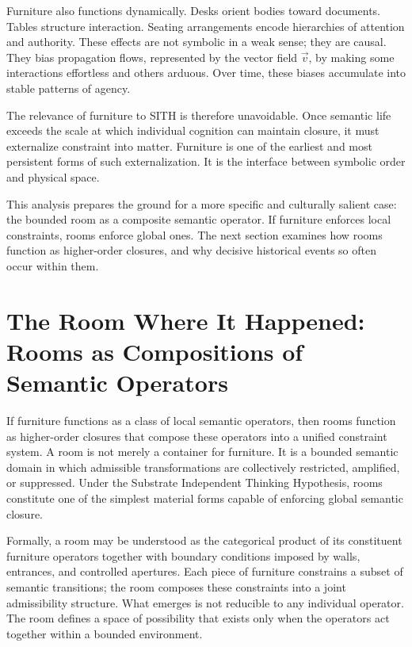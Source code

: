 \documentclass[11pt,oneside]{article}
\begin{document}
Furniture also functions dynamically. Desks orient bodies toward documents. Tables structure interaction. Seating arrangements encode hierarchies of attention and authority. These effects are not symbolic in a weak sense; they are causal. They bias propagation flows, represented by the vector field $\vec v$, by making some interactions effortless and others arduous. Over time, these biases accumulate into stable patterns of agency.

The relevance of furniture to SITH is therefore unavoidable. Once semantic life exceeds the scale at which individual cognition can maintain closure, it must externalize constraint into matter. Furniture is one of the earliest and most persistent forms of such externalization. It is the interface between symbolic order and physical space.

This analysis prepares the ground for a more specific and culturally salient case: the bounded room as a composite semantic operator. If furniture enforces local constraints, rooms enforce global ones. The next section examines how rooms function as higher-order closures, and why decisive historical events so often occur within them.

\section{The Room Where It Happened: Rooms as Compositions of Semantic Operators}

If furniture functions as a class of local semantic operators, then rooms function as higher-order closures that compose these operators into a unified constraint system. A room is not merely a container for furniture. It is a bounded semantic domain in which admissible transformations are collectively restricted, amplified, or suppressed. Under the Substrate Independent Thinking Hypothesis, rooms constitute one of the simplest material forms capable of enforcing global semantic closure.

Formally, a room may be understood as the categorical product of its constituent furniture operators together with boundary conditions imposed by walls, entrances, and controlled apertures. Each piece of furniture constrains a subset of semantic transitions; the room composes these constraints into a joint admissibility structure. What emerges is not reducible to any individual operator. The room defines a space of possibility that exists only when the operators act together within a bounded environment.
\end{document}
